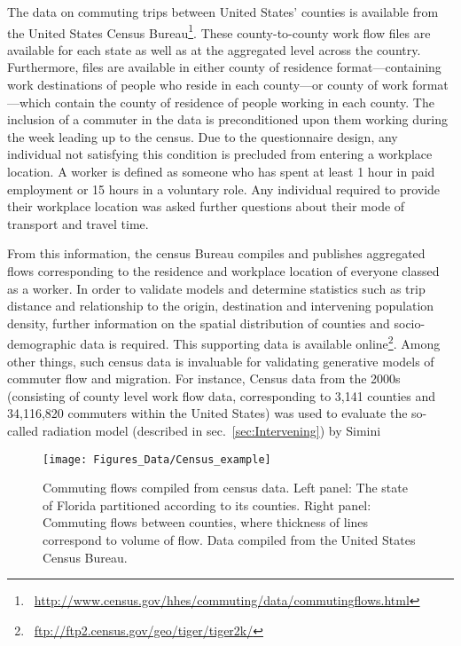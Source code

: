 The data on commuting trips between United States' counties is available from the United States Census Bureau\footnote{~\url{http://www.census.gov/hhes/commuting/data/commutingflows.html}}. These county-to-county work flow files are available for each state as well as at the aggregated level across the country. Furthermore, files are available in either county of residence format---containing work destinations of people who reside in each county---or county of work format---which contain the county of residence of people working in each county. The inclusion of a commuter in the data is preconditioned upon them working during the week leading up to the census. Due to the questionnaire design, any individual not satisfying this condition is precluded from entering a workplace location. A worker is defined as someone who has spent at least 1 hour in paid employment or 15 hours in a voluntary role. Any individual required to provide their workplace location was asked further questions about their mode of transport and travel time.

From this information, the census Bureau compiles and publishes aggregated flows corresponding to the residence and workplace location of everyone classed as a worker. In order to validate models and determine statistics such as trip distance and relationship to the origin, destination and intervening population density, further information on the spatial distribution of counties and socio-demographic data is required. This supporting data is available online\footnote{~\url{ftp://ftp2.census.gov/geo/tiger/tiger2k/}}. 
Among other things, such census data is invaluable for validating generative models of commuter flow and migration. For instance, Census data from the 2000s (consisting of county level work flow data, corresponding to 3,141 counties and 34,116,820 commuters within the United States) was used to evaluate the so-called radiation model (described in sec.~\ref{sec:Intervening}) by Simini \et\cite{simini_2012_universal}

\begin{figure}[t!]
\centering
\texttt{[image: Figures\_Data/Census\_example]}
\caption{Commuting flows compiled from census data. Left panel: The state of Florida partitioned according to its counties. Right panel: Commuting flows between counties, where thickness of lines correspond to volume of flow. Data compiled from the United States Census Bureau.}
\label{fig:Census_example}
\end{figure}

